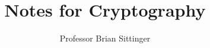 \documentclass{article}
\title{Notes for Cryptography}
\author{Professor Brian Sittinger}
\date{}
\begin{document}
\maketitle
\section{}
\end{document}
